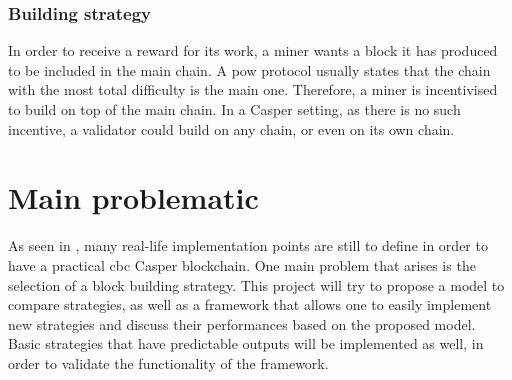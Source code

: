 \subsubsection{Building strategy}
In order to receive a reward for its work, a miner wants a block it has produced
to be included in the main chain. A \gls{pow} protocol usually states that the
chain with the most total difficulty is the main one. Therefore, a miner is
incentivised to build on top of the main chain. 
In a Casper setting, as there is no such incentive, a validator could build on
any chain, or even on its own chain.


\begin{table}[H]
\end{table}

\section{Main problematic}
As seen in , many real-life implementation points are still
to define in order to have a practical \gls{cbc} Casper blockchain. One main
problem that arises is the selection of a block building strategy. This project
will try to propose a model to compare strategies, as well as a framework that
allows one to easily implement new strategies and discuss their performances
based on the proposed model.  Basic strategies that have predictable outputs
will be implemented as well, in order to validate the functionality of the
framework.

